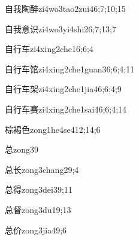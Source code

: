 \begin{verbete}{自我陶醉}{zi4wo3tao2zui4}{6;7;10;15}
\end{verbete}

\begin{verbete}{自我意识}{zi4wo3yi4shi2}{6;7;13;7}
\end{verbete}

\begin{verbete}{自行车}{zi4xing2che1}{6;6;4}
\end{verbete}

\begin{verbete}{自行车馆}{zi4xing2che1guan3}{6;6;4;11}
\end{verbete}

\begin{verbete}{自行车架}{zi4xing2che1jia4}{6;6;4;9}
\end{verbete}

\begin{verbete}{自行车赛}{zi4xing2che1sai4}{6;6;4;14}
\end{verbete}

\begin{verbete}{棕褐色}{zong1he4se4}{12;14;6}
\end{verbete}

\begin{verbete}{总}{zong3}{9}
\end{verbete}

\begin{verbete}{总长}{zong3chang2}{9;4}
\end{verbete}

\begin{verbete}{总得}{zong3dei3}{9;11}
\end{verbete}

\begin{verbete}{总督}{zong3du1}{9;13}
\end{verbete}

\begin{verbete}{总价}{zong3jia4}{9;6}
\end{verbete}

